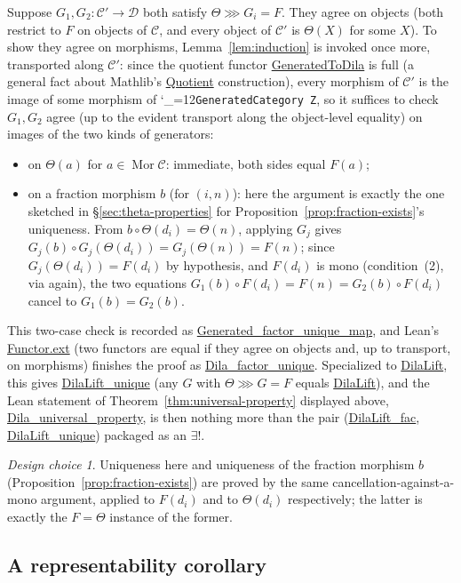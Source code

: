 \documentclass[11pt]{amsart}
\newcommand{\lc}[1]{\url{#1}}
\newcommand{\lcode}{\begingroup\catcode`\_=12\relax\lcodeInner}
\newcommand{\lcodeInner}[1]{\texttt{#1}\endgroup}
\theoremstyle{plain}
\theoremstyle{definition}
\theoremstyle{remark}
\newtheorem*{designchoice}{Design choice}
\newcommand{\calC}{\mathcal C}
\newcommand{\calD}{\mathcal D}
\DeclareMathOperator{\Mor}{Mor}
\begin{document}
Suppose $G_1, G_2 : \calC' \to \calD$ both satisfy $\Theta \ggg G_i = F$. They agree on
objects (both restrict to $F$ on objects of $\calC$, and every object of $\calC'$ is
$\Theta(X)$ for some $X$). To show they agree on morphisms, Lemma~\ref{lem:induction} is
invoked once more, transported along $\calC'$: since the quotient functor
\lc{GeneratedToDila} is full (a general fact about Mathlib's \lc{Quotient}
construction), every morphism of $\calC'$ is the image of some morphism of
\lcode{GeneratedCategory Z}, so it suffices to check $G_1, G_2$ agree (up to the evident
transport along the object-level equality) on images of the two kinds of generators:
\begin{itemize}
\item on $\Theta(a)$ for $a \in \Mor \calC$: immediate, both sides equal $F(a)$;
\item on a fraction morphism $b$ (for $(i,n)$): here the argument is exactly the one sketched
  in \S\ref{sec:theta-properties} for Proposition~\ref{prop:fraction-exists}'s uniqueness. From
  $b \circ \Theta(d_i) = \Theta(n)$, applying $G_j$ gives
  $G_j(b) \circ G_j(\Theta(d_i)) = G_j(\Theta(n)) = F(n)$; since $G_j(\Theta(d_i)) = F(d_i)$
  by hypothesis, and $F(d_i)$ is mono (condition~(2), via \citep[Fact~3.2]{Mayeux} again), the two equations
  $G_1(b)\circ F(d_i) = F(n) = G_2(b) \circ F(d_i)$ cancel to $G_1(b) = G_2(b)$.
\end{itemize}
This two-case check is recorded as \lc{Generated_factor_unique_map}, and
Lean's \lc{Functor.ext} (two functors are equal if they agree on objects and, up to
transport, on morphisms) finishes the proof as \lc{Dila_factor_unique}. Specialized to
\lc{DilaLift}, this gives \lc{DilaLift_unique} (any $G$ with $\Theta \ggg G = F$ equals
\lc{DilaLift}), and the Lean statement of Theorem~\ref{thm:universal-property} displayed
above, \lc{Dila_universal_property}, is then nothing more than the pair
(\lc{DilaLift_fac}, \lc{DilaLift_unique}) packaged as an $\exists!$.

\begin{designchoice}
Uniqueness here and uniqueness of the fraction morphism $b$
(Proposition~\ref{prop:fraction-exists}) are proved by the same cancellation-against-a-mono
argument, applied to $F(d_i)$ and to $\Theta(d_i)$ respectively; the latter is exactly the
$F=\Theta$ instance of the former.
\end{designchoice}

\subsection{A representability corollary}
\end{document}
